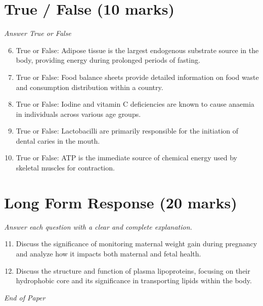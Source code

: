 \documentclass[12pt]{article}
\begin{document}
\section*{True / False (10 marks)}
\textit{Answer True or False}
\begin{enumerate}[label=\arabic*.]
\setcounter{enumi}{5}
\item True or False: Adipose tissue is the largest endogenous substrate source in the body, providing energy during prolonged periods of fasting.
\item True or False: Food balance sheets provide detailed information on food waste and consumption distribution within a country.
\item True or False: Iodine and vitamin C deficiencies are known to cause anaemia in individuals across various age groups.
\item True or False: Lactobacilli are primarily responsible for the initiation of dental caries in the mouth.
\item True or False: ATP is the immediate source of chemical energy used by skeletal muscles for contraction.
\end{enumerate}

\section*{Long Form Response (20 marks)}
\textit{Answer each question with a clear and complete explanation.}
\begin{enumerate}[label=\arabic*.]
\setcounter{enumi}{10}
\item Discuss the significance of monitoring maternal weight gain during pregnancy and analyze
how it impacts both maternal and fetal health.
\item Discuss the structure and function of plasma lipoproteins, focusing on their hydrophobic
core and its significance in transporting lipids within the body.
\end{enumerate}

\vfill
\noindent\textit{End of Paper}
\end{document}
